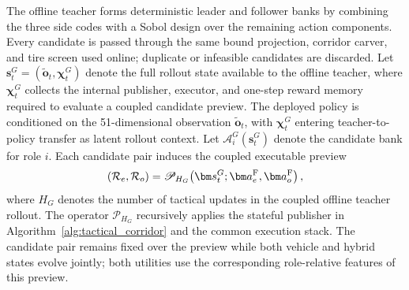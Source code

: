 \documentclass[sensors,article,submit,moreauthors]{Definitions/mdpi}
\begin{document}
The offline teacher forms deterministic leader and follower banks by combining
the three side codes with a Sobol design over the remaining action components.
Every candidate is passed through the same bound projection, corridor carver,
and tire screen used online; duplicate or infeasible candidates are discarded.
Let
\(
\bm s_t^G=(\widetilde{\bm o}_t,\bm\chi_t^G)
\)
denote the full rollout state available to the offline teacher, where
\(\bm\chi_t^G\) collects the internal publisher, executor, and one-step
reward memory required to evaluate a coupled candidate preview. The deployed
policy is conditioned on the 51-dimensional observation
\(\widetilde{\bm o}_t\), with \(\bm\chi_t^G\) entering teacher-to-policy
transfer as latent rollout context. Let \(\mathcal A_i^G(\bm s_t^G)\) denote
the candidate bank for role \(i\).
Each candidate pair induces the coupled executable preview
\begin{equation}
(\mathcal R_e,\mathcal R_o)=
\mathscr P_{H_G}\!\left(
\bm s_t^G;\bm a_e^{\rm F},\bm a_o^{\rm F}\right),
\label{eq:coupled_game_preview}
\end{equation}
where $H_G$ denotes the number of tactical updates in the coupled offline
teacher rollout. The operator $\mathscr P_{H_G}$ recursively applies the stateful
publisher in Algorithm~\ref{alg:tactical_corridor} and the common execution stack.
The candidate pair remains fixed over the preview while both vehicle and
hybrid states evolve jointly; both utilities use the corresponding
role-relative features of this preview.
\end{document}
